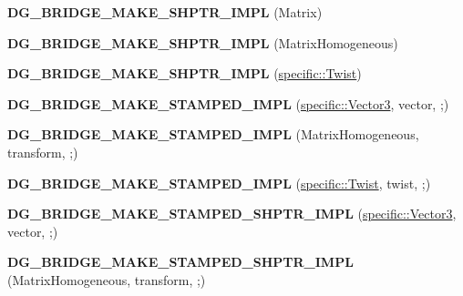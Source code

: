 \begin{DoxyCompactItemize}
{\bfseries D\+G\+\_\+\+B\+R\+I\+D\+G\+E\+\_\+\+M\+A\+K\+E\+\_\+\+S\+H\+P\+T\+R\+\_\+\+I\+M\+PL} (Matrix)
\item 
\mbox{\label{namespacedynamic__graph_a15169d3d19abe3ecd077c806664016f2}} 
{\bfseries D\+G\+\_\+\+B\+R\+I\+D\+G\+E\+\_\+\+M\+A\+K\+E\+\_\+\+S\+H\+P\+T\+R\+\_\+\+I\+M\+PL} (Matrix\+Homogeneous)
\item 
\mbox{\label{namespacedynamic__graph_a7a18758dda76357a81bb50eeef37a4a7}} 
{\bfseries D\+G\+\_\+\+B\+R\+I\+D\+G\+E\+\_\+\+M\+A\+K\+E\+\_\+\+S\+H\+P\+T\+R\+\_\+\+I\+M\+PL} (\hyperlink{classdynamic__graph_1_1specific_1_1Twist}{specific\+::\+Twist})
\item 
\mbox{\label{namespacedynamic__graph_a9ca03447cc73ee1896bd12ada5bb2648}} 
{\bfseries D\+G\+\_\+\+B\+R\+I\+D\+G\+E\+\_\+\+M\+A\+K\+E\+\_\+\+S\+T\+A\+M\+P\+E\+D\+\_\+\+I\+M\+PL} (\hyperlink{classdynamic__graph_1_1specific_1_1Vector3}{specific\+::\+Vector3}, vector, ;)
\item 
\mbox{\label{namespacedynamic__graph_a47d608ba5fa44fed65981f7de3dc5280}} 
{\bfseries D\+G\+\_\+\+B\+R\+I\+D\+G\+E\+\_\+\+M\+A\+K\+E\+\_\+\+S\+T\+A\+M\+P\+E\+D\+\_\+\+I\+M\+PL} (Matrix\+Homogeneous, transform, ;)
\item 
\mbox{\label{namespacedynamic__graph_a23c50654f469e1907e043efe96958be7}} 
{\bfseries D\+G\+\_\+\+B\+R\+I\+D\+G\+E\+\_\+\+M\+A\+K\+E\+\_\+\+S\+T\+A\+M\+P\+E\+D\+\_\+\+I\+M\+PL} (\hyperlink{classdynamic__graph_1_1specific_1_1Twist}{specific\+::\+Twist}, twist, ;)
\item 
\mbox{\label{namespacedynamic__graph_a8555401941f21f8647d7315ab05cf3d6}} 
{\bfseries D\+G\+\_\+\+B\+R\+I\+D\+G\+E\+\_\+\+M\+A\+K\+E\+\_\+\+S\+T\+A\+M\+P\+E\+D\+\_\+\+S\+H\+P\+T\+R\+\_\+\+I\+M\+PL} (\hyperlink{classdynamic__graph_1_1specific_1_1Vector3}{specific\+::\+Vector3}, vector, ;)
\item 
\mbox{\label{namespacedynamic__graph_a23bd5389346b9cb0e93d0190cf26c76d}} 
{\bfseries D\+G\+\_\+\+B\+R\+I\+D\+G\+E\+\_\+\+M\+A\+K\+E\+\_\+\+S\+T\+A\+M\+P\+E\+D\+\_\+\+S\+H\+P\+T\+R\+\_\+\+I\+M\+PL} (Matrix\+Homogeneous, transform, ;)

\end{DoxyCompactItemize}
